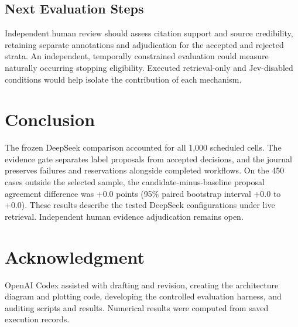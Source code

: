 \documentclass[conference]{IEEEtran}
\newcommand{\pct}{\%}
\begin{document}
\subsection{Next Evaluation Steps}
Independent human review should assess citation support and source credibility, retaining separate annotations and adjudication for the accepted and rejected strata. An independent, temporally constrained evaluation could measure naturally occurring stopping eligibility. Executed retrieval-only and Jev-disabled conditions would help isolate the contribution of each mechanism.

\section{Conclusion}
The frozen DeepSeek comparison accounted for all 1,000 scheduled cells. The evidence gate separates label proposals from accepted decisions, and the journal preserves failures and reservations alongside completed workflows. On the 450 cases outside the selected sample, the candidate-minus-baseline proposal agreement difference was +0.0 points (95\pct{} paired bootstrap interval +0.0 to +0.0). These results describe the tested DeepSeek configurations under live retrieval. Independent human evidence adjudication remains open.

\section*{Acknowledgment}
OpenAI Codex assisted with drafting and revision, creating the architecture diagram and plotting code, developing the controlled evaluation harness, and auditing scripts and results. Numerical results were computed from saved execution records.
\end{document}

